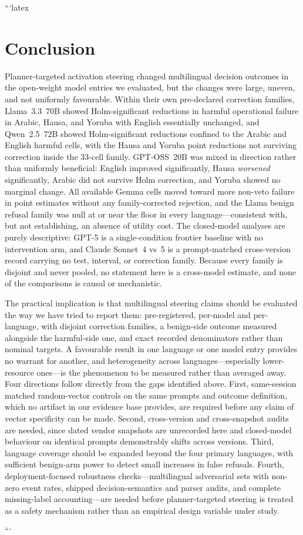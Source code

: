 ```latex
\section{Conclusion}

Planner-targeted activation steering changed multilingual decision outcomes in
the open-weight model entries we evaluated, but the changes were large,
uneven, and not uniformly favourable. Within their own pre-declared correction
families, Llama~3.3~70B showed Holm-significant reductions in harmful
operational failure in Arabic, Hausa, and Yoruba with English essentially
unchanged, and Qwen~2.5~72B showed Holm-significant reductions confined to the
Arabic and English harmful cells, with the Hausa and Yoruba point reductions not
surviving correction inside the 33-cell family. GPT-OSS~20B was
mixed in direction rather than uniformly beneficial: English improved
significantly, Hausa \emph{worsened} significantly, Arabic did not survive Holm
correction, and Yoruba showed no marginal change. All available Gemma cells moved
toward more non-veto failure in point estimates without any family-corrected
rejection, and the Llama benign refusal family was null at or near the floor in
every language---consistent with, but not establishing, an absence of utility
cost. The closed-model analyses are purely descriptive: GPT-5 is a
single-condition frontier baseline with no intervention arm, and Claude
Sonnet~4 vs~5 is a prompt-matched cross-version record carrying no test,
interval, or correction family. Because every family is disjoint and never
pooled, no statement here is a cross-model estimate, and none of the comparisons
is causal or mechanistic.

The practical implication is that multilingual steering claims should be
evaluated the way we have tried to report them: pre-registered, per-model and
per-language, with disjoint correction families, a benign-side outcome measured
alongside the harmful-side one, and exact recorded denominators rather than
nominal targets. A favourable result in one language or one model entry provides
no warrant for another, and heterogeneity across languages---especially
lower-resource ones---is the phenomenon to be measured rather than averaged
away. Four directions follow directly from the gaps identified above. First,
same-session matched random-vector controls on the same prompts and outcome
definition, which no artifact in our evidence base provides, are required before
any claim of vector specificity can be made. Second, cross-version and
cross-snapshot audits are needed, since dated vendor snapshots are unrecorded
here and closed-model behaviour on identical prompts demonstrably shifts across
versions. Third, language coverage should be expanded beyond the four primary
languages, with sufficient benign-arm power to detect small increases in false
refusals. Fourth, deployment-focused robustness checks---multilingual
adversarial sets with non-zero event rates, shipped decision-semantics and
parser audits, and complete missing-label accounting---are needed before
planner-targeted steering is treated as a safety mechanism rather than an
empirical design variable under study.

```
